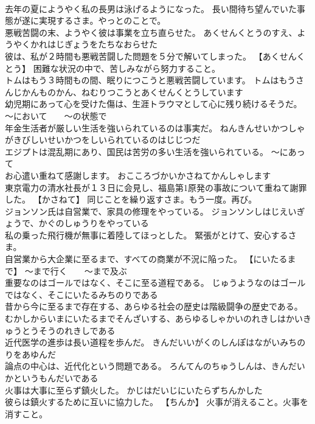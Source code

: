 \documentclass[8pt]{extreport}
\begin{document}
\begin{CJK}{UTF8}{min}
\\	去年の夏にようやく私の長男は泳げるようになった。	長い間待ち望んでいた事態が遂に実現するさま。やっとのことで。
\\	悪戦苦闘の末、ようやく彼は事業を立ち直らせた。	あくせんくとうのすえ、ようやくかれはじぎょうをたちなおらせた 
\\	彼は、私が２時間も悪戦苦闘した問題を５分で解いてしまった。	【あくせんくとう】 困難な状況の中で、苦しみながら努力すること。
\\	トムはもう３時間もの間、眠りにつこうと悪戦苦闘しています。	トムはもうさんじかんものかん、ねむりつこうとあくせんくとうしています 
\\	幼児期にあって心を受けた傷は、生涯トラウマとして心に残り続けるそうだ。	～において　　～の状態で
\\	年金生活者が厳しい生活を強いられているのは事実だ。	ねんきんせいかつしゃがきびしいせいかつをしいられているのはじじつだ 
\\	エジプトは混乱期にあり、国民は苦労の多い生活を強いられている。	～にあって
\\	お心遣い重ねて感謝します。	おこころづかいかさねてかんしゃします 
\\	東京電力の清水社長が１３日に会見し、福島第1原発の事故について重ねて謝罪した。	【かさねて】 同じことを繰り返すさま。もう一度。再び。
\\	ジョンソン氏は自営業で、家具の修理をやっている。	ジョンソンしはじえいぎょうで、かぐのしゅうりをやっている 
\\	私の乗った飛行機が無事に着陸してほっとした。	緊張がとけて、安心するさま。
\\	自営業から大企業に至るまで、すべての商業が不況に陥った。	【にいたるまで】 ～まで行く　　～まで及ぶ
\\	重要なのはゴールではなく、そこに至る道程である。	じゅうようなのはゴールではなく、そこにいたるみちのりである 
\\	昔から今に至るまで存在する、あらゆる社会の歴史は階級闘争の歴史である。	むかしからいまにいたるまでそんざいする、あらゆるしゃかいのれきしはかいきゅうとうそうのれきしである 
\\	近代医学の進歩は長い道程を歩んだ。	きんだいいがくのしんぽはながいみちのりをあゆんだ 
\\	論点の中心は、近代化という問題である。	ろんてんのちゅうしんは、きんだいかというもんだいである 
\\	火事は大事に至らず鎮火した。	かじはだいじにいたらずちんかした 
\\	彼らは鎮火するために互いに協力した。	【ちんか】 火事が消えること。火事を消すこと。

\end{CJK}
\end{document}
